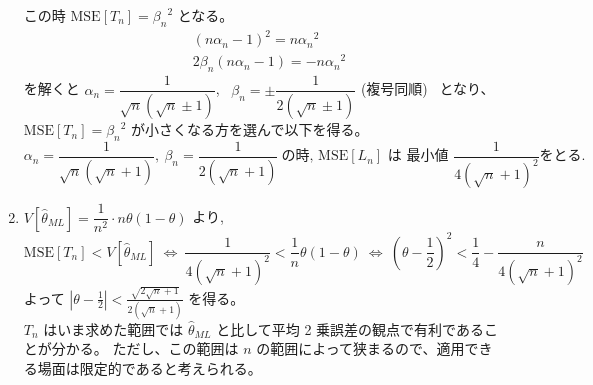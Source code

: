 \documentclass[./main.tex]{subfiles}
\begin{document}
\begin{enumerate}
        この時 $\mathrm{MSE} [T_n] = {\beta_n}^2$ となる。
        \begin{subequations}
            \begin{align}
                &(n \alpha_n - 1)^2 = n {\alpha_n}^2 \label{eq:2024-suri-3-mse-a}\\
                &2 \beta_n (n \alpha_n - 1) = - n { \alpha_n}^2 \label{eq:2024-suri-3-mse-b}
            \end{align}
        \end{subequations}
        を解くと $\alpha_n = \dfrac{1}{\sqrt{n} (\sqrt{n} \pm 1)}$, \ $\beta_n = \pm \dfrac{1}{2 (\sqrt{n} \pm 1)}$ (複号同順) \ となり、
        $\mathrm{MSE} [T_n] = {\beta_n}^2$ が小さくなる方を選んで以下を得る。
        \begin{equation*}
            \alpha_n = \frac{1}{\sqrt{n} ( \sqrt{n} + 1)}, \
                \beta_n = \frac{1}{2 (\sqrt{n} + 1)} \ 
                \mbox{の時, } \mathrm{MSE} [L_n] \mbox{ は 最小値 } 
                \frac{1}{4 ( \sqrt{n} + 1)^2} \mbox{をとる.}
        \end{equation*}

        \item $V [\hat{\theta}_{ML}] = \dfrac{1}{n^2} \cdot n \theta (1- \theta)$ より,
        \begin{equation*}
            \mathrm{MSE} [T_n] < V [\hat{\theta}_{ML}]
            \ \iff \
            \frac{1}{4 (\sqrt{n} + 1)^2} < \frac{1}{n} \theta (1 - \theta)
            \ \iff \
            \left( \theta - \frac{1}{2} \right)^2
                < \frac{1}{4} - \frac{n}{ 4 (\sqrt{n} + 1)^2}
        \end{equation*}
        よって $\displaystyle \left| \theta - \frac{1}{2} \right| < \frac{\sqrt{ 2 \sqrt{n} + 1}}{2 (\sqrt{n} + 1) }$ を得る。\\
        $T_n$ はいま求めた範囲では $\hat{\theta}_{ML}$ と比して平均 2 乗誤差の観点で有利であることが分かる。
        ただし、この範囲は $n$ の範囲によって狭まるので、適用できる場面は限定的であると考えられる。

        
    \end{enumerate}

\end{document}
